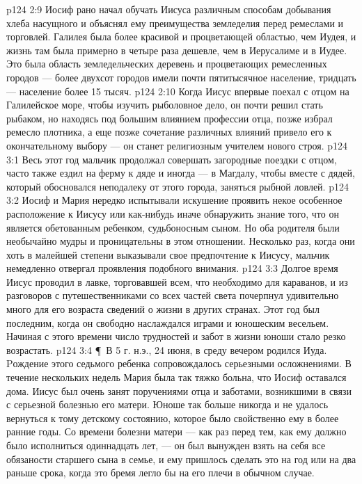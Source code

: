 \vs p124 2:9 Иосиф рано начал обучать Иисуса различным способам добывания хлеба насущного и объяснял ему преимущества земледелия перед ремеслами и торговлей. Галилея была более красивой и процветающей областью, чем Иудея, и жизнь там была примерно в четыре раза дешевле, чем в Иерусалиме и в Иудее. Это была область земледельческих деревень и процветающих ремесленных городов --- более двухсот городов имели почти пятитысячное население, тридцать --- население более 15 тысяч.
\vs p124 2:10 Когда Иисус впервые поехал с отцом на Галилейское море, чтобы изучить рыболовное дело, он почти решил стать рыбаком, но находясь под большим влиянием профессии отца, позже избрал ремесло плотника, а еще позже сочетание различных влияний привело его к окончательному выбору --- он станет религиозным учителем нового строя.
\vs p124 3:1 Весь этот год мальчик продолжал совершать загородные поездки с отцом, часто также ездил на ферму к дяде и иногда --- в Магдалу, чтобы вместе с дядей, который обосновался неподалеку от этого города, заняться рыбной ловлей.
\vs p124 3:2 Иосиф и Мария нередко испытывали искушение проявить некое особенное расположение к Иисусу или как\hyp{}нибудь иначе обнаружить знание того, что он является обетованным ребенком, судьбоносным сыном. Но оба родителя были необычайно мудры и проницательны в этом отношении. Несколько раз, когда они хоть в малейшей степени выказывали свое предпочтение к Иисусу, мальчик немедленно отвергал проявления подобного внимания.
\vs p124 3:3 Долгое время Иисус проводил в лавке, торговавшей всем, что необходимо для караванов, и из разговоров с путешественниками со всех частей света почерпнул удивительно много для его возраста сведений о жизни в других странах. Этот год был последним, когда он свободно наслаждался играми и юношеским весельем. Начиная с этого времени число трудностей и забот в жизни юноши стало резко возрастать.
\vs p124 3:4 \P\ В 5 г. н.э., 24 июня, в среду вечером родился Иуда. Pождение этого седьмого ребенка сопровождалось серьезными осложнениями. В течение нескольких недель Мария была так тяжко больна, что Иосиф оставался дома. Иисус был очень занят поручениями отца и заботами, возникшими в связи с серьезной болезнью его матери. Юноше так больше никогда и не удалось вернуться к тому детскому состоянию, которое было свойственно ему в более ранние годы. Со времени болезни матери --- как раз перед тем, как ему должно было исполниться одиннадцать лет, --- он был вынужден взять на себя все обязаности старшего сына в семье, и ему пришлось сделать это на год или на два раньше срока, когда это бремя легло бы на его плечи в обычном случае.
